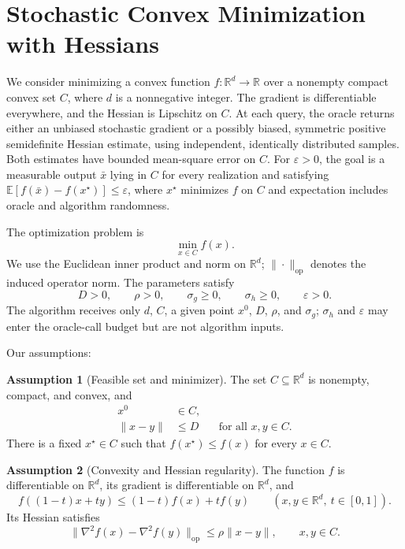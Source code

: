 \documentclass[10pt]{article}
\theoremstyle{definition}
\newtheorem{assumption}{Assumption}
\begin{document}
\section*{Stochastic Convex Minimization with Hessians}
We consider minimizing a convex function $f:\mathbb{R}^d\to\mathbb{R}$ over a nonempty compact convex set $C$, where $d$ is a nonnegative integer. The gradient is differentiable everywhere, and the Hessian is Lipschitz on $C$. At each query, the oracle returns either an unbiased stochastic gradient or a possibly biased, symmetric positive semidefinite Hessian estimate, using independent, identically distributed samples. Both estimates have bounded mean-square error on $C$. For $\varepsilon>0$, the goal is a measurable output $\bar{x}$ lying in $C$ for every realization and satisfying $\mathbb{E}[f(\bar{x})-f(x^\star)]\leq\varepsilon$, where $x^\star$ minimizes $f$ on $C$ and expectation includes oracle and algorithm randomness.

The optimization problem is
\[
\min_{x\in C} f(x).
\]
We use the Euclidean inner product and norm on $\mathbb{R}^d$; $\|\cdot\|_{\mathrm{op}}$ denotes the induced operator norm. The parameters satisfy
\[
D>0,\qquad \rho>0,\qquad \sigma_g\geq0,\qquad
\sigma_h\geq0,\qquad \varepsilon>0.
\]
The algorithm receives only $d$, $C$, a given point $x^0$, $D$, $\rho$, and $\sigma_g$; $\sigma_h$ and $\varepsilon$ may enter the oracle-call budget but are not algorithm inputs.

Our assumptions:
\begin{assumption}[Feasible set and minimizer]
The set $C\subseteq\mathbb{R}^d$ is nonempty, compact, and convex, and
\[
\begin{aligned}
x^0&\in C,\\
\|x-y\|&\leq D &&\text{for all }x,y\in C.
\end{aligned}
\]
There is a fixed $x^\star\in C$ such that $f(x^\star)\leq f(x)$ for every $x\in C$.
\end{assumption}

\begin{assumption}[Convexity and Hessian regularity]
The function $f$ is differentiable on $\mathbb{R}^d$, its gradient is differentiable on $\mathbb{R}^d$, and
\[
f((1-t)x+ty)\leq (1-t)f(x)+t f(y)
\qquad
(x,y\in\mathbb{R}^d,\ t\in[0,1]).
\]
Its Hessian satisfies
\[
\|\nabla^2 f(x)-\nabla^2 f(y)\|_{\mathrm{op}}
\leq \rho\|x-y\|,
\qquad x,y\in C.
\]
\end{assumption}
\end{document}
